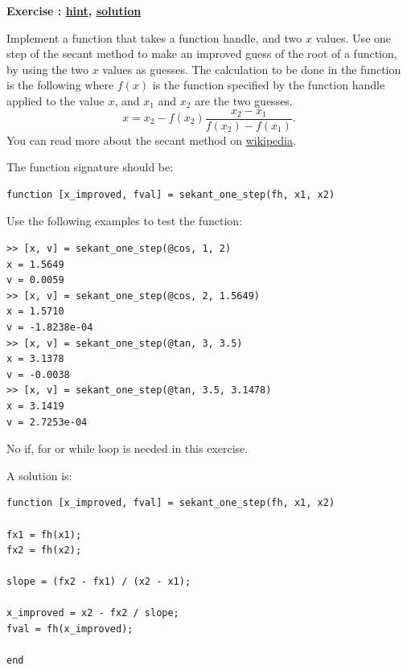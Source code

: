 \documentclass[12pt,a4paper]{article}
\makeatletter
\newcommand{\linkdest}[1]{\Hy@raisedlink{\hypertarget{#1}{}}}
\newcounter{ex}
\numberwithin{ex}{section}
\newenvironment{ex}[1][]{%
\filbreak
\bigskip
\refstepcounter{ex}
\noindent
\textbf{\linkdest{\theex{}exercise}{}Exercise \theex{}: #1\hfill\hyperlink{\theex{}hint}{hint}, \hyperlink{\theex{}solution}{solution}}\par\noindent}{}
\makeatother
\begin{document}
\begin{ex}
\label{exSecantMethodOneStep}%
Implement a function that takes a function handle, and two 
$x$ values.
Use one step of the secant method to make an improved guess of the
root of a function, by using the two $x$ values as guesses.
The calculation to be done in the function is the following
where $f(x)$ is the function specified by the function handle
applied to the value $x$, and $x_1$ and $x_2$ are the two
guesses.
\[
x=x_{2}-f(x_{2}){\frac {x_{2}-x_{1}}{f(x_{2})-f(x_{1})}}.
\]
You can read more about the secant method on \href{https://en.wikipedia.org/wiki/Secant_method}{wikipedia}.

The function signature should be:
\begin{lstlisting}
function [x_improved, fval] = sekant_one_step(fh, x1, x2)
\end{lstlisting}
Use the following examples to test the function:
\begin{lstlisting}
>> [x, v] = sekant_one_step(@cos, 1, 2)
x = 1.5649
v = 0.0059
>> [x, v] = sekant_one_step(@cos, 2, 1.5649)
x = 1.5710
v = -1.8238e-04
>> [x, v] = sekant_one_step(@tan, 3, 3.5)
x = 3.1378
v = -0.0038
>> [x, v] = sekant_one_step(@tan, 3.5, 3.1478)
x = 3.1419
v = 2.7253e-04
\end{lstlisting}
\begin{hint}
No if, for or while loop is needed in this exercise.
\end{hint}
\begin{sol}
A solution is:
\begin{lstlisting}
function [x_improved, fval] = sekant_one_step(fh, x1, x2)

fx1 = fh(x1);
fx2 = fh(x2);

slope = (fx2 - fx1) / (x2 - x1);

x_improved = x2 - fx2 / slope;
fval = fh(x_improved);

end
\end{lstlisting}
\end{sol}
\end{ex}
\end{document}
